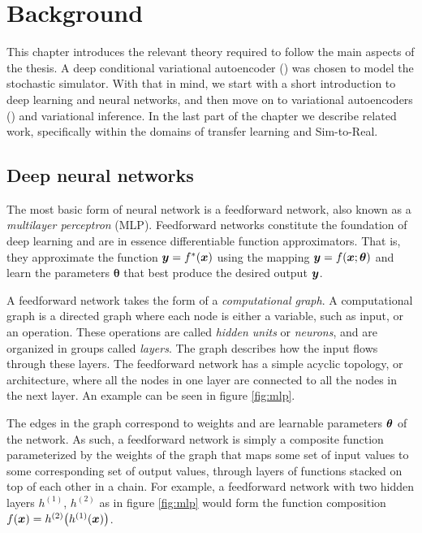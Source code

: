
\chapter{Background}
\label{background}
This chapter introduces the relevant theory required to follow the main aspects of the thesis. A deep conditional variational autoencoder (\cvae{}) was chosen to model the stochastic simulator. With that in mind, we start with a short introduction to deep learning and neural networks, and then move on to variational autoencoders (\vae{}) and variational inference. In the last part of the chapter we describe related work, specifically within the domains of transfer learning and Sim-to-Real.


\section{Deep neural networks}

The most basic form of neural network is a feedforward network, also known as a \emph{multilayer perceptron} (MLP). Feedforward networks constitute the foundation of deep learning and are in essence differentiable function approximators. That is, they approximate the function $\boldsymbol{y}=f^{*}(\boldsymbol{x})$ using the mapping $\boldsymbol{y} = f(\boldsymbol{x}; \boldsymbol{\theta})$ and learn the parameters $\pmb{\theta}$ that best produce the desired output $\boldsymbol{y}$.

A feedforward network takes the form of a \textit{computational graph}. A computational graph is a directed graph where each node is either a variable, such as input, or an operation. These operations are called \emph{hidden units} or \emph{neurons}, and are organized in groups called \emph{layers}. The graph describes how the input flows through these layers.
The feedforward network has a simple acyclic topology, or architecture, where all the nodes in one layer are connected to all the nodes in the next layer. An example can be seen in figure \ref{fig:mlp}.

The edges in the graph correspond to weights and are learnable parameters $\boldsymbol{\theta}$ of the network. As such, a feedforward network is simply a composite function parameterized by the weights of the graph that maps some set of input values to some corresponding set of output values, through layers of functions stacked on top of each other in a chain. For example, a feedforward network with two hidden layers $h^{(1)}$, $h^{(2)}$ as in figure \ref{fig:mlp} would form the function composition $f(\boldsymbol{x}) = h^{(2)}\big(h^{(1)}(\boldsymbol{x})\big)$.

